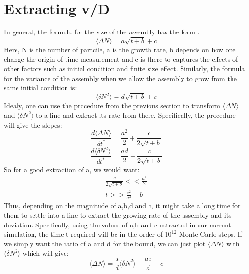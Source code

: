 \documentclass[amsmath,preprintnumbers,10pt,nofootinbib,prl,twocolumn]{revtex4-1}
\begin{document}
\section{Extracting v/D}
In general, the formula for the size of the assembly has the form :
\begin{equation}
 \langle\Delta N\rangle=a\sqrt{t+b}+c
\end{equation}
Here, N is the number of partcile, a is the growth rate, b depends on how one change the origin of time measurement and c is there to captures the effects of other factors such as initial condition and finite size effect. Similarly, the formula for the variance of the assembly when we allow the assembly to grow from the same initial condition is:
\begin{equation}
\langle\delta N^2\rangle =d\sqrt{t+b}+e
\end{equation}
Idealy, one can use the procedure from the previous section to transform $\langle\Delta N\rangle$ and $\langle\delta N^2\rangle$ to a line and extract its rate from there.
Specifically, the procedure will give the slopes:
\begin{equation}
\frac{d\langle\Delta N \rangle}{dt^{*}}=\frac{a^2}{2}+\frac{c}{2\sqrt{t+b}}
\end{equation}
\begin{equation}
\frac{d\langle\delta N^2 \rangle}{dt^{*}}=\frac{ad}{2}+\frac{c}{2\sqrt{t+b}}
\end{equation}
So for a good extraction of a, we would want:
\begin{equation}
\begin{split}
\frac{|c|}{2\sqrt{t+b}}<<\frac{a^2}{2}
\\ t >>\frac{c^2}{a^4}-b
\end{split}
\end{equation}
Thus, depending on the magnitude of a,b,d and c, it might take a long time for them to settle into a line to extract the growing rate of the assembly and its deviation. Specifically, using the values of a,b and c extracted in our current simulation, the time t required will be in the order of $10^{12}$ Monte Carlo steps. 
If we simply want the ratio of a and d for the bound, we can just plot $\langle\Delta N\rangle$ with $\langle\delta N^2 \rangle$ which will give:
\begin{equation}
\langle\Delta N\rangle=\frac{a}{d}\langle\delta N^2 \rangle-\frac{ae}{d}+c
\end{equation}
\end{document}
